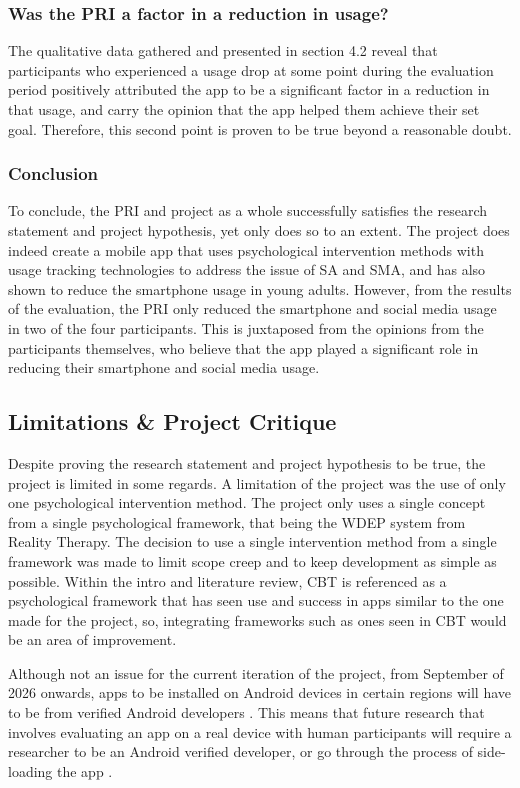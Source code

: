 \documentclass[12pt]{article}
\begin{document}
\subsubsection{Was the PRI a factor in a reduction in usage?}
The qualitative data gathered and presented in section 4.2 reveal that participants who experienced a usage drop at some point during the evaluation period positively attributed the app to be 
a significant factor in a reduction in that usage, and carry the opinion that the app helped them achieve their set goal. Therefore, this second point is proven to be true beyond a reasonable
doubt.

\subsubsection{Conclusion}
To conclude, the PRI and project as a whole successfully satisfies the research statement and project hypothesis, yet only does so to an extent. The project does indeed create a mobile app that 
uses psychological intervention methods with usage tracking technologies to address the issue of SA and SMA, and has also shown to reduce the smartphone usage in young adults. However, from the 
results of the evaluation, the PRI only reduced the smartphone and social media usage in two of the four participants. This is juxtaposed from the opinions from the participants themselves, who 
believe that the app played a significant role in reducing their smartphone and social media usage.

\subsection{Limitations \& Project Critique}
Despite proving the research statement and project hypothesis to be true, the project is limited in some regards. A limitation of the project was the use of only one 
psychological intervention method. The project only uses a single concept from a single psychological framework, that being the WDEP system from Reality Therapy. The 
decision to use a single intervention method from a single framework was made to limit scope creep and to keep development as simple as possible. Within the intro and
literature review, CBT is referenced as a psychological framework that has seen use and success in apps similar to the one made for the project, so, integrating
frameworks such as ones seen in CBT would be an area of improvement. \newline

Although not an issue for the current iteration of the project, from September of 2026 onwards, apps to be installed on Android devices in certain regions will have to 
be from verified Android developers \autocite{androiddevelopment-verification}. This means that future research that involves evaluating an app on a real device with human 
participants will require a researcher to be an Android verified developer, or go through the process of side-loading the app \autocite{androiddevelopment-blog}. \newline
\end{document}
